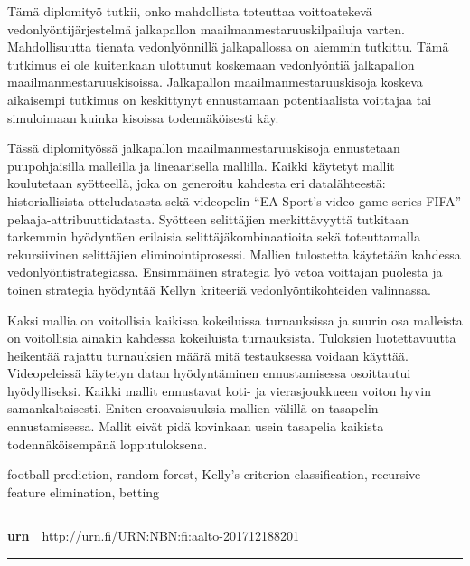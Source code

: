 \begin{spacing}{1.05}

\vspace{.8mm}

{\small
  Tämä diplomityö tutkii, onko mahdollista toteuttaa voittoatekevä vedonlyöntijärjestelmä jalkapallon maailmanmestaruuskilpailuja varten. Mahdollisuutta tienata vedonlyönnillä jalkapallossa on aiemmin tutkittu. Tämä tutkimus ei ole kuitenkaan ulottunut koskemaan vedonlyöntiä jalkapallon maailmanmestaruuskisoissa. Jalkapallon maailmanmestaruuskisoja koskeva aikaisempi tutkimus on keskittynyt ennustamaan potentiaalista voittajaa tai simuloimaan kuinka kisoissa todennäköisesti käy.

  Tässä diplomityössä jalkapallon maailmanmestaruuskisoja ennustetaan puupohjaisilla malleilla ja lineaarisella mallilla. Kaikki käytetyt mallit koulutetaan syötteellä, joka on generoitu kahdesta eri datalähteestä: historiallisista otteludatasta sekä videopelin “EA Sport’s video game series FIFA” pelaaja-attribuuttidatasta. Syötteen selittäjien merkittävyyttä tutkitaan tarkemmin hyödyntäen erilaisia selittäjäkombinaatioita sekä toteuttamalla rekursiivinen selittäjien eliminointiprosessi. Mallien tulostetta käytetään kahdessa vedonlyöntistrategiassa. Ensimmäinen strategia lyö vetoa voittajan puolesta ja toinen strategia hyödyntää Kellyn kriteeriä vedonlyöntikohteiden valinnassa.

  Kaksi mallia on voitollisia kaikissa kokeiluissa turnauksissa ja suurin osa malleista on voitollisia ainakin kahdessa kokeiluista turnauksista. Tuloksien luotettavuutta heikentää rajattu turnauksien määrä mitä testauksessa voidaan käyttää. Videopeleissä käytetyn datan hyödyntäminen ennustamisessa osoittautui hyödylliseksi. Kaikki mallit ennustavat koti- ja vierasjoukkueen voiton hyvin samankaltaisesti. Eniten eroavaisuuksia mallien välillä on tasapelin ennustamisessa. Mallit eivät pidä kovinkaan usein tasapelia kaikista todennäköisempänä lopputuloksena.
}

\vfill

\end{spacing}
\begin{spacing}{.88}
{\parindent0pt %

\parbox[t]{121.6mm}{\raggedright\small football prediction, random forest, Kelly's criterion  classification, recursive feature elimination, betting}

\vspace{.5mm}\rule{\textwidth}{.75pt}

{\fontsize{10.5pt}{10.5pt}\bfseries\sffamily\lsstyle urn}~~{\small http://urn.fi/URN:NBN:fi:aalto-201712188201}

\vspace{-2.4mm}\rule{\textwidth}{.75pt}

} %
\end{spacing}

